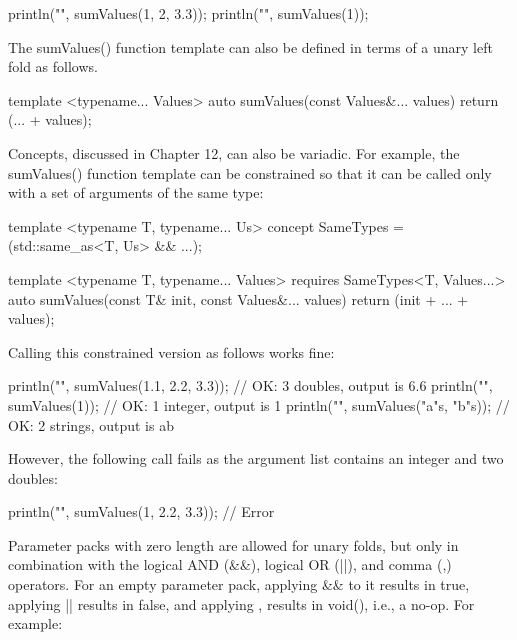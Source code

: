 \begin{cpp}
println("{}", sumValues(1, 2, 3.3));
println("{}", sumValues(1));
\end{cpp}

The sumValues() function template can also be defined in terms of a unary left fold as follows.

\begin{cpp}
template <typename... Values>
auto sumValues(const Values&... values) { return (... + values); }
\end{cpp}

Concepts, discussed in Chapter 12, can also be variadic. For example, the sumValues() function template can be constrained so that it can be called only with a set of arguments of the same type:

\begin{cpp}
template <typename T, typename... Us>
concept SameTypes = (std::same_as<T, Us> && ...);

template <typename T, typename... Values>
    requires SameTypes<T, Values...>
auto sumValues(const T& init, const Values&... values)
{ return (init + ... + values); }
\end{cpp}

Calling this constrained version as follows works fine:

\begin{cpp}
println("{}", sumValues(1.1, 2.2, 3.3)); // OK: 3 doubles, output is 6.6
println("{}", sumValues(1)); // OK: 1 integer, output is 1
println("{}", sumValues("a"s, "b"s)); // OK: 2 strings, output is ab
\end{cpp}

However, the following call fails as the argument list contains an integer and two doubles:

\begin{cpp}
println("{}", sumValues(1, 2.2, 3.3)); // Error
\end{cpp}

Parameter packs with zero length are allowed for unary folds, but only in combination with the logical AND (\&\&), logical OR (||), and comma (,) operators. For an empty parameter pack, applying \&\& to it results in true, applying || results in false, and applying , results in void(), i.e., a no-op. For example:

















